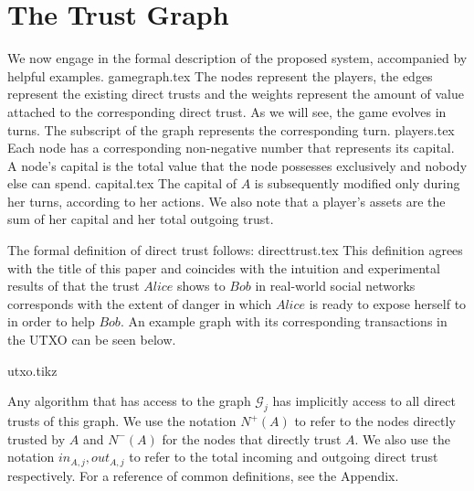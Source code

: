 \section{The Trust Graph}
   We now engage in the formal description of the proposed system, accompanied by helpful examples.
   {gamegraph.tex}
   The nodes represent the players, the edges represent the existing direct trusts and the weights represent the amount of
   value attached to the corresponding direct trust. As we will see, the game evolves in turns. The subscript of the graph
   represents the corresponding turn.
   {players.tex}
   Each node has a corresponding non-negative number that represents its capital. A node's capital is the total value that
   the node possesses exclusively and nobody else can spend.
   {capital.tex}
   The capital of $A$ is subsequently modified only during her turns, according to her actions. We also note that a
   player's assets are the sum of her capital and her total outgoing trust.

   The formal definition of direct trust follows:
   {directtrust.tex}
   This definition agrees with the title of this paper and coincides with the intuition and experimental results of
   \cite{kmrs} that the trust $Alice$ shows to $Bob$ in real-world social networks corresponds with the extent
   of danger in which $Alice$ is ready to expose herself to in order to help $Bob$. An example graph with its corresponding
   transactions in the UTXO can be seen below.

   {utxo.tikz}

   Any algorithm that has access to the graph $\mathcal{G}_j$ has implicitly access to all direct trusts of this graph.
   We use the notation $N^{+}(A)$ to refer to the nodes directly trusted by $A$ and $N^{-}(A)$ for the nodes that directly
   trust $A$. We also use the notation $in_{A, j}, out_{A, j}$ to refer to the total incoming and outgoing direct trust
   respectively. For a reference of common definitions, see the Appendix.

